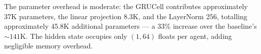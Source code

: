 The parameter overhead is moderate: the GRUCell contributes approximately 37K parameters, the linear projection 8.3K, and the LayerNorm 256, totalling approximately 45.8K additional parameters --- a 33\% increase over the baseline's ${\sim}141$K. The hidden state occupies only $(1, 64)$ floats per agent, adding negligible memory overhead.

